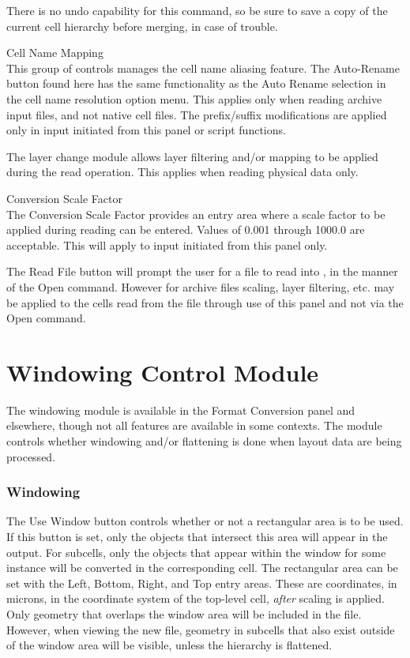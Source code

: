 \begin{description}
There is no undo capability for this command, so be sure to save a
copy of the current cell hierarchy before merging, in case of trouble.

\item{\cb Cell Name Mapping}\\
This group of controls manages the cell name aliasing feature.  The
{\cb Auto-Rename} button found here has the same functionality as the
{\cb Auto Rename} selection in the cell name resolution option menu. 
This applies only when reading archive input files, and not native
cell files.  The prefix/suffix modifications are applied only in input
initiated from this panel or script functions.

The layer change module allows layer filtering and/or mapping to be
applied during the read operation.  This applies when reading physical
data only.

\item{\cb Conversion Scale Factor}\\
The {\cb Conversion Scale Factor} provides an entry area where a scale
factor to be applied during reading can be entered.  Values of 0.001
through 1000.0 are acceptable.  This will apply to input initiated
from this panel only.

The {\cb Read File} button will prompt the user for a file to read
into {\Xic}, in the manner of the {\cb Open} command.  However for
archive files scaling, layer filtering, etc.  may be applied to the
cells read from the file through use of this panel and not via the
{\cb Open} command.
\end{description}


\section{Windowing Control Module}
The windowing module is available in the {\cb Format Conversion} panel
and elsewhere, though not all features are available in some contexts. 
The module controls whether windowing and/or flattening is done when
layout data are being processed.

\subsubsection{Windowing}

The {\cb Use Window} button controls whether or not a rectangular area
is to be used.  If this button is set, only the objects that intersect
this area will appear in the output.  For subcells, only the objects
that appear within the window for some instance will be converted in
the corresponding cell.  The rectangular area can be set with the {\cb
Left}, {\cb Bottom}, {\cb Right}, and {\cb Top} entry areas.  These
are coordinates, in microns, in the coordinate system of the top-level
cell, {\it after} scaling is applied.  Only geometry that overlaps the
window area will be included in the file.  However, when viewing the
new file, geometry in subcells that also exist outside of the window
area will be visible, unless the hierarchy is flattened.


